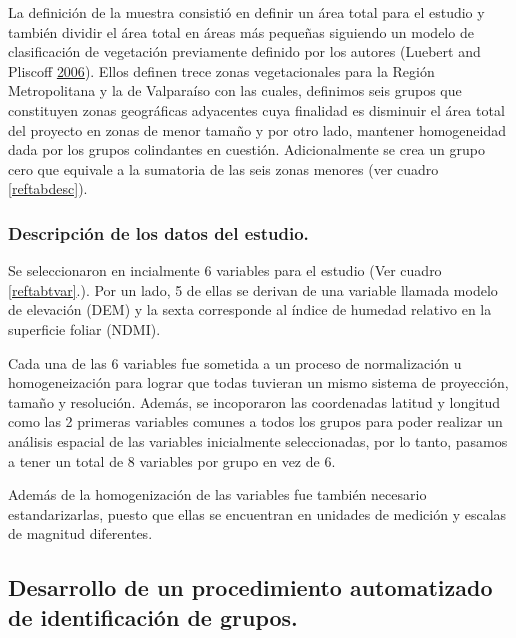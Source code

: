 \documentclass[]{article}
\begin{document}
La definición de la muestra consistió en definir un área total para el
estudio y también dividir el área total en áreas más pequeñas siguiendo
un modelo de clasificación de vegetación previamente definido por los
autores (Luebert and Pliscoff
\protect\hyperlink{ref-luebert_sinopsis_2006}{2006}). Ellos definen
trece zonas vegetacionales para la Región Metropolitana y la de
Valparaíso con las cuales, definimos seis grupos que constituyen zonas
geográficas adyacentes cuya finalidad es disminuir el área total del
proyecto en zonas de menor tamaño y por otro lado, mantener homogeneidad
dada por los grupos colindantes en cuestión. Adicionalmente se crea un
grupo cero que equivale a la sumatoria de las seis zonas menores (ver
cuadro \ref{reftabdesc}).



\subsubsection{Descripción de los datos del
estudio.}\label{descripcion-de-los-datos-del-estudio.}

Se seleccionaron en incialmente 6 variables para el estudio (Ver cuadro
\ref{reftabtvar}.). Por un lado, 5 de ellas se derivan de una variable
llamada modelo de elevación (DEM) y la sexta corresponde al índice de
humedad relativo en la superficie foliar (NDMI).



Cada una de las 6 variables fue sometida a un proceso de normalización u
homogeneización para lograr que todas tuvieran un mismo sistema de
proyección, tamaño y resolución. Además, se incoporaron las coordenadas
latitud y longitud como las 2 primeras variables comunes a todos los
grupos para poder realizar un análisis espacial de las variables
inicialmente seleccionadas, por lo tanto, pasamos a tener un total de 8
variables por grupo en vez de 6.

Además de la homogenización de las variables fue también necesario
estandarizarlas, puesto que ellas se encuentran en unidades de medición
y escalas de magnitud diferentes.



\subsection{Desarrollo de un procedimiento automatizado de
identificación de
grupos.}\label{desarrollo-de-un-procedimiento-automatizado-de-identificacion-de-grupos.}
\end{document}
